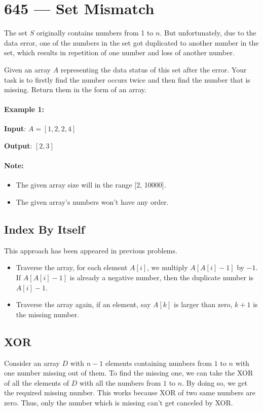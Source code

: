 \section{645 --- Set Mismatch}
The set $S$ originally contains numbers from 1 to $n$. But unfortunately, due to the data error, one of the numbers in the set got duplicated to another number in the set, which results in repetition of one number and loss of another number.

Given an array $A$ representing the data status of this set after the error. Your task is to firstly find the number occurs twice and then find the number that is missing. Return them in the form of an array.

\paragraph{Example 1:}

\begin{flushleft}
\textbf{Input}: $A = [1,2,2,4]$

\textbf{Output}: $[2,3]$
\end{flushleft}

\paragraph{Note:}

\begin{itemize}
\item The given array size will in the range [2, 10000].
\item The given array's numbers won't have any order.
\end{itemize}

\subsection{Index By Itself}
This approach has been appeared in previous problems. 

\begin{itemize}
\item Traverse the array, for each element $A[i]$, we multiply $A[A[i]-1]$ by $-1$. If $A[A[i]-1]$ is already a negative number, then the duplicate number is $A[i]-1$.
\item Traverse the array again, if an element, say $A[k]$ is larger than zero, $k+1$ is the missing number.
\end{itemize}

\subsection{XOR}
Consider an array $D$ with $n−1$ elements containing numbers from $1$ to $n$ with one number missing out of them. To find the missing one, we can take the XOR of all the elements of $D$ with all the numbers from $1$ to $n$. By doing so, we get the required missing number. This works because XOR of two same numbers are zero. Thus, only the number which is missing can't get canceled by XOR.

